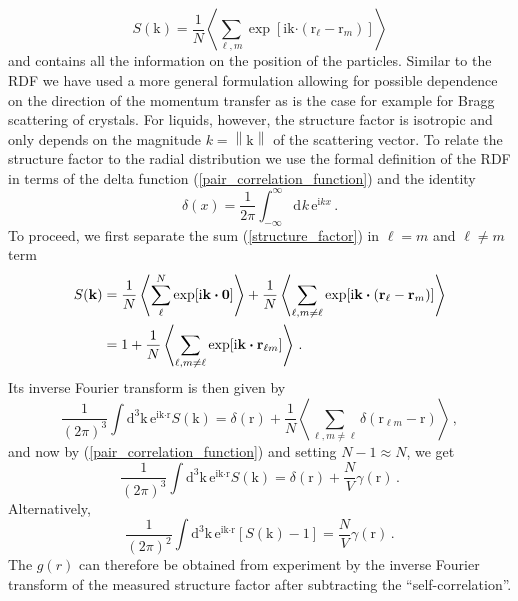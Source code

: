 \documentclass{article}
\theoremstyle{plain}\theoremheaderfont{\normalfont\itshape}\theorembodyfont{\rmfamily}\theoremseparator{.}\newtheorem*{rem}{Remark}\newtheorem*{ex}{Example}\newtheorem*{proof}{Proof}\newtheorem*{altp}{Alternative proof}
\theoremstyle{plain}\theoremheaderfont{\normalfont\bfseries}\theorembodyfont{\rmfamily}\theoremseparator{.}\newtheorem{thm}{Theorem}[section]\newtheorem{lem}[thm]{Lemma}\newtheorem{prop}[thm]{Proposition}\newtheorem*{cor}{Corollary}\newtheorem{defn}[thm]{Definition}\newtheorem{clm}[thm]{Claim}\newtheorem{clminproof}{Claim}\newtheorem{alg}[thm]{Algorithm}\newtheorem{hyp}[thm]{Hypothesis}\newtheorem{law}[thm]{Law}
\theoremstyle{break}\theoremheaderfont{\normalfont\itshape}\theorembodyfont{\rmfamily}\theoremseparator{.\medskip}\newtheorem*{proofskip}{Proof}\newtheorem*{exs}{Examples}\newtheorem*{rems}{Remarks}
\theoremstyle{break}\theoremheaderfont{\normalfont\bfseries}\theorembodyfont{\rmfamily}\theoremseparator{.\medskip}\newtheorem{lemskip}[thm]{Lemma}\newtheorem{defnskip}[thm]{Definition}\newtheorem{propskip}[thm]{Proposition}\newtheorem{thmskip}[thm]{Theorem}
\numberwithin{equation}{section}
\newcommand{\ii}{\mathrm{i}}
\newcommand{\ee}{\mathrm{e}}
\newcommand{\dd}[2][]{\mathrm{d}^{#1} #2\,}
\newcommand{\eval}[1]{\left\langle #1 \right\rangle}
\newcommand{\vb}[1]{\bm{\mathrm{#1}}}
\newcommand{\vdot}{\bm{\cdot}}
\newcommand{\norm}[1]{\left\| #1 \right\|}
\begin{document}
    \begin{equation}\label{structure_factor}
        S(\vb{k})=\frac{1}{N}\eval{\sum_{\ell,m}\exp[\ii\vb{k}\vdot(\vb{r}_\ell-\vb{r}_m)]}
    \end{equation}
    and contains all the information on the position of the particles. Similar to the RDF we have used a more general formulation allowing for possible dependence on the direction of the momentum transfer as is the case for example for Bragg scattering of crystals. For liquids, however, the structure factor is isotropic and only depends on the magnitude \(k=\norm{\vb{k}}\) of the scattering vector. To relate the structure factor to the radial distribution we use the formal definition of the RDF in terms of the delta function (\ref{pair_correlation_function}) and the identity
    \begin{equation}
        \delta(x)=\frac{1}{2\pi}\int_{-\infty}^{\infty}\dd{k}\ee^{\ii kx}\,.
    \end{equation}
    To proceed, we first separate the sum (\ref{structure_factor}) in \(\ell=m\) and \(\ell\ne m\) term
    \begin{align}
        S(\vb{k})&=\frac{1}{N}\eval{\sum_{\ell}^{N}\exp[\ii\vb{k}\vdot\vb{0}]}+\frac{1}{N}\eval{\sum_{\ell,m\ne\ell}\exp[\ii\vb{k}\vdot(\vb{r}_\ell-\vb{r}_m)]}\notag\\
        &=1+\frac{1}{N}\eval{\sum_{\ell,m\ne\ell}\exp[\ii\vb{k}\vdot\vb{r}_{\ell m}]}\,.
    \end{align}
    Its inverse Fourier transform is then given by
    \begin{equation}
        \frac{1}{(2\pi)^3}\int\dd[3]{\vb{k}}\ee^{\ii\vb{k}\vdot\vb{r}} S(\vb{k})=\delta(\vb{r})+\frac{1}{N}\eval{\sum_{\ell,m\ne\ell}\delta(\vb{r}_{\ell m}-\vb{r})}\,,
    \end{equation}
    and now by (\ref{pair_correlation_function}) and setting \(N-1\approx N\), we get
    \begin{equation}
        \frac{1}{(2\pi)^3}\int\dd[3]{\vb{k}}\ee^{\ii\vb{k}\vdot\vb{r}} S(\vb{k})=\delta(\vb{r})+\frac{N}{V}\gamma(\vb{r})\,.
    \end{equation}
    Alternatively,
    \begin{equation}
        \frac{1}{(2\pi)^2}\int\dd[3]{\vb{k}}\ee^{\ii\vb{k}\vdot\vb{r}}[S(\vb{k})-1]=\frac{N}{V}\gamma(\vb{r})\,.
    \end{equation}
    The \(g(r)\) can therefore be obtained from experiment by the inverse Fourier transform of the measured structure factor after subtracting the ``self-correlation''.
\end{document}

